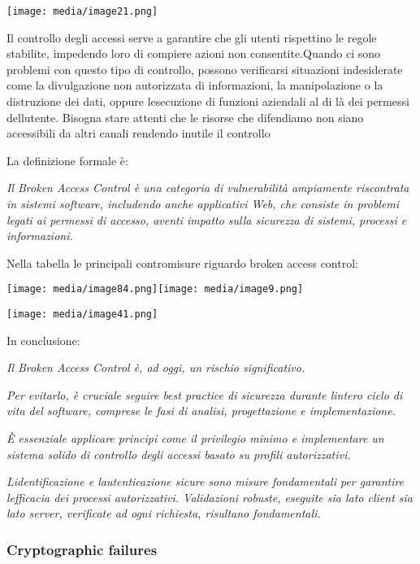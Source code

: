 \texttt{[image: media/image21.png]}

Il controllo degli accessi serve a garantire che gli utenti rispettino
le regole stabilite, impedendo loro di compiere azioni non
consentite.Quando ci sono problemi con questo tipo di controllo, possono
verificarsi situazioni indesiderate come la divulgazione non autorizzata
di informazioni, la manipolazione o la distruzione dei dati, oppure
l\textquotesingle esecuzione di funzioni aziendali al di là dei permessi
dell\textquotesingle utente. Bisogna stare attenti che le risorse che
difendiamo non siano accessibili da altri canali rendendo inutile il
controllo

La definizione formale è:

\emph{Il Broken Access Control è una categoria di vulnerabilità
ampiamente riscontrata in sistemi software, includendo anche applicativi
Web, che consiste in problemi legati ai permessi di accesso, aventi
impatto sulla sicurezza di sistemi, processi e informazioni.}

Nella tabella le principali contromisure riguardo broken access control:

\texttt{[image: media/image84.png]}\texttt{[image: media/image9.png]}

\texttt{[image: media/image41.png]}

In conclusione:

\emph{Il Broken Access Control è, ad oggi, un rischio significativo.}

\emph{Per evitarlo, è cruciale seguire best practice di sicurezza
durante l\textquotesingle intero ciclo di vita del software, comprese le
fasi di analisi, progettazione e implementazione.}

\emph{È essenziale applicare principi come il privilegio minimo e
implementare un sistema solido di controllo degli accessi basato su
profili autorizzativi.}

\emph{L\textquotesingle identificazione e
l\textquotesingle autenticazione sicure sono misure fondamentali per
garantire l\textquotesingle efficacia dei processi autorizzativi.
Validazioni robuste, eseguite sia lato client sia lato server,
verificate ad ogni richiesta, risultano fondamentali.}

\subsubsection{Cryptographic failures}\label{cryptographic-failures}

